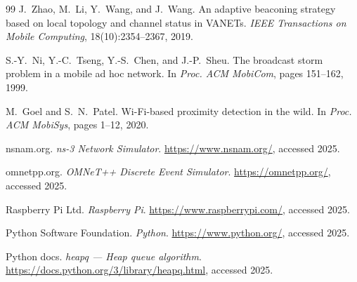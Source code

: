 \documentclass[12pt,a4paper,oneside]{report}
\begin{document}
\begin{thebibliography}{99}
 J.~Zhao, M.~Li, Y.~Wang, and J.~Wang. An adaptive beaconing
strategy based on local topology and channel status in VANETs. \emph{IEEE
Transactions on Mobile Computing}, 18(10):2354--2367, 2019.

 S.-Y.~Ni, Y.-C.~Tseng, Y.-S.~Chen, and J.-P.~Sheu. The
broadcast storm problem in a mobile ad hoc network. In \emph{Proc. ACM
MobiCom}, pages 151--162, 1999.

 M.~Goel and S.~N.~Patel. Wi-Fi-based proximity detection in
the wild. In \emph{Proc. ACM MobiSys}, pages 1--12, 2020.

 nsnam.org. \emph{ns-3 Network Simulator}.
\url{https://www.nsnam.org/}, accessed 2025.

 omnetpp.org. \emph{OMNeT++ Discrete Event Simulator}.
\url{https://omnetpp.org/}, accessed 2025.

 Raspberry Pi Ltd. \emph{Raspberry Pi}.
\url{https://www.raspberrypi.com/}, accessed 2025.

 Python Software Foundation. \emph{Python}.
\url{https://www.python.org/}, accessed 2025.

 Python docs. \emph{heapq --- Heap queue algorithm}.
\url{https://docs.python.org/3/library/heapq.html}, accessed 2025.

\end{thebibliography}
\end{document}
